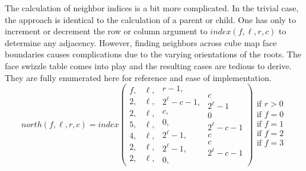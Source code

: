 \documentclass[oneside,10pt]{memoir}
\newcommand{\scmindex} [1]{\ensuremath{\mathit{index}(#1)}}
\newcommand{\scmnorth} [1]{\ensuremath{\mathit{north}(#1)}}
\begin{document}
\begin{Spacing}{1.1}
The calculation of neighbor indices is a bit more complicated. In the trivial case, the approach is identical to the calculation of a parent or child. One has only to increment or decrement the row or column argument to \scmindex{f,\ell,r,c} to determine any adjacency. However, finding neighbors across cube map face boundaries causes complications due to the varying orientations of the roots. The face swizzle table comes into play and the resulting cases are tedious to derive. They are fully enumerated here for reference and ease of implementation.
\[\scmnorth{f,\ell,r,c}=\mathit{index}\left(
\begin{array}{c}
  f, \\ 2, \\ 2, \\ 5, \\ 4, \\ 2, \\ 2,
\end{array}
\begin{array}{c}
  \ell, \\ \ell, \\ \ell, \\ \ell, \\ \ell, \\ \ell, \\ \ell,
\end{array}
\begin{array}{c}
  r-1, \\ 2^\ell-c-1, \\ c, \\ 0, \\ 2^\ell-1, \\ 2^\ell -1, \\ 0,
\end{array}
\begin{array}{c}
  c \\ 2^\ell-1 \\ 0 \\ 2^\ell-c-1 \\ c \\ c \\ 2^\ell-c-1
\end{array}
\right)
\begin{array}{l}
  \text{if } r > 0 \\
  \text{if } f = 0 \\
  \text{if } f = 1 \\
  \text{if } f = 2 \\
  \text{if } f = 3 \\

\end{array}\]
\end{Spacing}
\end{document}
